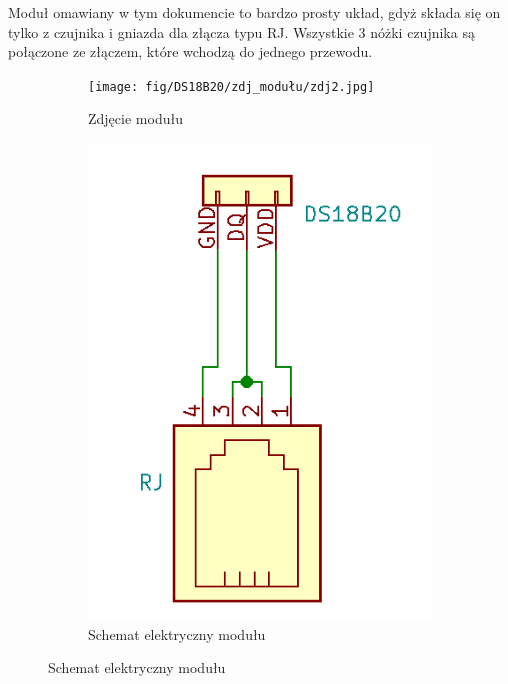 \documentclass[11pt, a4paper]{article}
\begin{document}
\vspace{0.75cm}

Moduł omawiany w tym dokumencie to bardzo prosty układ, gdyż składa się on tylko z czujnika i gniazda dla złącza typu RJ. 
Wszystkie 3 nóżki czujnika są połączone ze złączem, które wchodzą do jednego przewodu. 

\begin{figure}[h]
\centering
\begin{subfigure}{.5\textwidth}
\centering
\texttt{[image: fig/DS18B20/zdj\_modułu/zdj2.jpg]}
\caption{Zdjęcie modułu}
\label{fig:_zdjecie_modulu}
\end{subfigure}%
\begin{subfigure}{.5\textwidth}
\centering
\includegraphics[width=.6\linewidth]{fig/DS18B20/polaczenie_modulu/schem.png}
\caption{Schemat elektryczny modułu}
\label{fig:_schemat_modulu}
\end{subfigure}
\label{fig:modul}
\end{figure}
\vspace{0.5cm}
\end{document}
